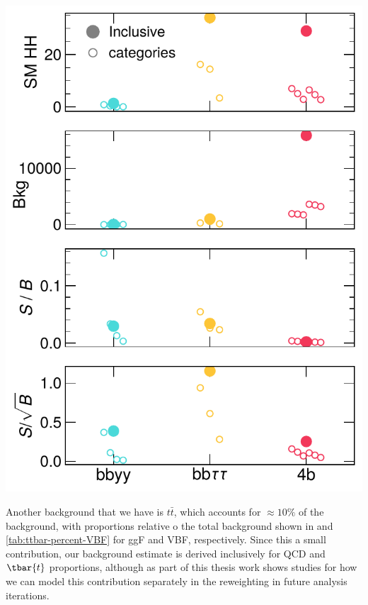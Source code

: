 \begin{minipage}{0.60\textwidth}
\centering
\includegraphics[width=.8\textwidth]{figures/my_dihiggs/chan_cf_threshold_9}
\label{fig:hh-chan-breakdown}
\end{minipage}


Another background that we have is $t\bar{t}$, which accounts for $\approx 10\%$ of the background, with proportions relative o the total background shown in \Tab{\ref{tab:ttbar-percent-ggF-4b}} and \ref{tab:ttbar-percent-VBF} for ggF and VBF, respectively. Since this a small contribution, our background estimate is derived inclusively for QCD and $\tbar{t}$ proportions, although as part of this thesis work \App{\ref{app:ttbar-rw}} shows studies for how we can model this contribution separately in the reweighting in future analysis iterations.

